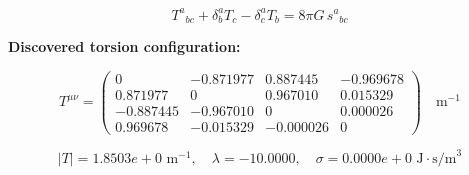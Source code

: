 
\begin{equation}
  T^a{}_{bc} + \delta^a_b T_c - \delta^a_c T_b = 8\pi G \, s^a{}_{bc}
\end{equation}

\textbf{Discovered torsion configuration:}

\begin{equation}
  T^{\mu\nu} = \begin{pmatrix}
    0 & -0.871977 & 0.887445 & -0.969678 \\
    0.871977 & 0 & 0.967010 & 0.015329 \\
    -0.887445 & -0.967010 & 0 & 0.000026 \\
    0.969678 & -0.015329 & -0.000026 & 0
  \end{pmatrix} \quad \text{m}^{-1}
\end{equation}

\begin{equation}
  |T| = 1.8503e+0 \text{ m}^{-1}, \quad
  \lambda = -10.0000, \quad
  \sigma = 0.0000e+0 \text{ J}\cdot\text{s/m}^3
\end{equation}
